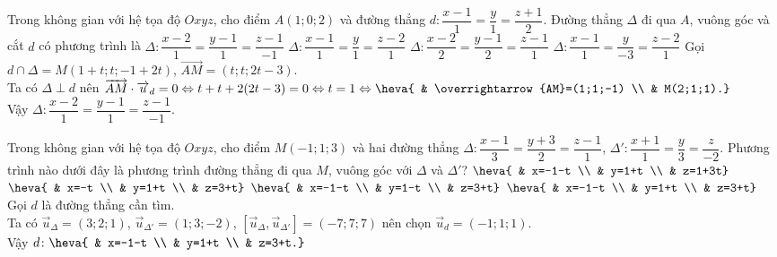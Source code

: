 \begin{ex}%
Trong không gian với hệ tọa độ $Oxyz$, cho điểm  $A(1;0;2)$ và đường thẳng $d\colon \dfrac{x-1}{1}=\dfrac{y}{1}=\dfrac{z+1}{2}$. Đường thẳng $\Delta$ đi qua $A$, vuông góc và cắt $d$ có phương trình là
\choice
{\True $\Delta\colon \dfrac{x-2}{1}=\dfrac{y-1}{1}=\dfrac{z-1}{-1}$}
{$\Delta\colon \dfrac{x-1}{1}=\dfrac{y}{1}=\dfrac{z-2}{1}$}
{$\Delta\colon \dfrac{x-2}{2}=\dfrac{y-1}{2}=\dfrac{z-1}{1}$}
{$\Delta\colon \dfrac{x-1}{1}=\dfrac{y}{-3}=\dfrac{z-2}{1}$}
\loigiai
{
Gọi $d\cap\Delta=M(1+t;t;-1+2t)$, $\overrightarrow{AM}=(t;t;2t-3)$.\\
Ta có $\Delta\perp d$ nên $\overrightarrow{AM}\cdot\overrightarrow{u}_{d}=0 \Leftrightarrow t+t+2(2t-3)=0 \Leftrightarrow t=1 \Leftrightarrow \heva{ & \overrightarrow{AM}=(1;1;-1) \\ & M(2;1;1).}$\\
Vậy $\Delta\colon \dfrac{x-2}{1}=\dfrac{y-1}{1}=\dfrac{z-1}{-1}$.
}
\end{ex}

\begin{ex}%
Trong không gian với hệ tọa độ $Oxyz$, cho điểm  $M(-1;1;3)$ và hai đường thẳng $\Delta\colon \dfrac{x-1}{3}=\dfrac{y+3}{2}=\dfrac{z-1}{1}$, $\Delta'\colon \dfrac{x+1}{1}=\dfrac{y}{3}=\dfrac{z}{-2}$. Phương trình nào dưới đây là phương trình đường thẳng đi qua $M$, vuông góc với $\Delta$ và $\Delta'$?
\choice
{$\heva{ & x=-1-t \\ & y=1+t \\ & z=1+3t}$}
{$\heva{ & x=-t \\ & y=1+t \\ & z=3+t}$}
{$\heva{ & x=-1-t \\ & y=1-t \\ & z=3+t}$}
{\True $\heva{ & x=-1-t \\ & y=1+t \\ & z=3+t}$}
\loigiai
{
Gọi $d$ là đường thẳng cần tìm.\\
Ta có $\overrightarrow{u}_{\Delta}=(3;2;1)$, $\overrightarrow{u}_{\Delta'}=(1;3;-2)$, $\left[\overrightarrow{u}_{\Delta},\overrightarrow{u}_{\Delta'}\right]=(-7;7;7)$ nên chọn $\overrightarrow{u}_{d}=(-1;1;1)$.\\
Vậy $d\colon \heva{ & x=-1-t \\ & y=1+t \\ & z=3+t.}$
}
\end{ex}

